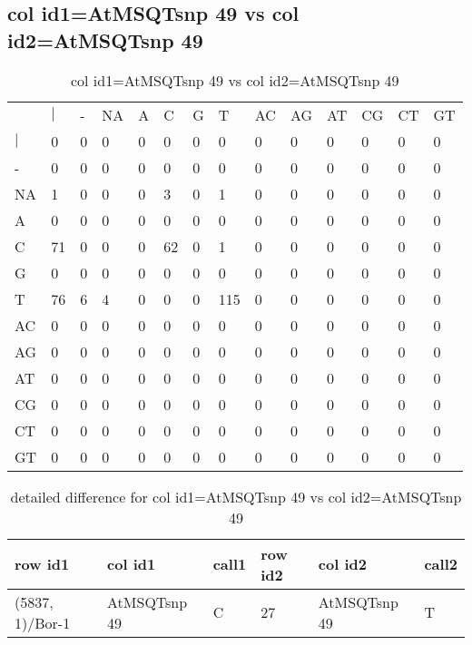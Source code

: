 \subsection{col id1=AtMSQTsnp 49 vs col id2=AtMSQTsnp 49}
\begin{center}
\begin{longtable}{|l|l|l|l|l|l|l|l|l|l|l|l|l|l|}
\caption{col id1=AtMSQTsnp 49 vs col id2=AtMSQTsnp 49} \label{table_dm934}\\
\hline
\\
\hline
&$|$&-&NA&A&C&G&T&AC&AG&AT&CG&CT&GT\\
$|$&0&0&0&0&0&0&0&0&0&0&0&0&0\\
-&0&0&0&0&0&0&0&0&0&0&0&0&0\\
NA&1&0&0&0&3&0&1&0&0&0&0&0&0\\
A&0&0&0&0&0&0&0&0&0&0&0&0&0\\
C&71&0&0&0&62&0&1&0&0&0&0&0&0\\
G&0&0&0&0&0&0&0&0&0&0&0&0&0\\
T&76&6&4&0&0&0&115&0&0&0&0&0&0\\
AC&0&0&0&0&0&0&0&0&0&0&0&0&0\\
AG&0&0&0&0&0&0&0&0&0&0&0&0&0\\
AT&0&0&0&0&0&0&0&0&0&0&0&0&0\\
CG&0&0&0&0&0&0&0&0&0&0&0&0&0\\
CT&0&0&0&0&0&0&0&0&0&0&0&0&0\\
GT&0&0&0&0&0&0&0&0&0&0&0&0&0\\
\hline
\end{longtable}
\end{center}

\begin{center}
\begin{longtable}{|l|l|l|l|l|l|}
\caption{detailed difference for col id1=AtMSQTsnp 49 vs col id2=AtMSQTsnp 49} \label{table_dm935}\\
\hline
row id1&col id1&call1&row id2&col id2&call2\\
\hline
(5837, 1)/Bor-1&AtMSQTsnp 49&C&27&AtMSQTsnp 49&T\\
\hline
\end{longtable}
\end{center}

